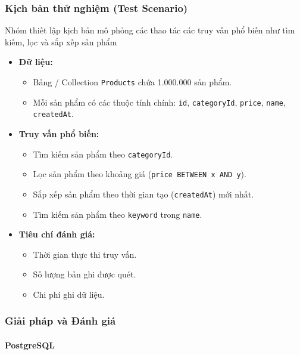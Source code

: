 \subsubsection{Kịch bản thử nghiệm (Test Scenario)}
Nhóm thiết lập kịch bản mô phỏng các thao tác các truy vấn phổ biến như tìm kiếm, lọc và sắp xếp sản phẩm
\begin{itemize}[label=$\circ$]
    \item \textbf{Dữ liệu:}
    \begin{itemize}[label=$\bullet$]
        \item Bảng / Collection \texttt{Products} chứa 1.000.000 sản phẩm.
        \item Mỗi sản phẩm có các thuộc tính chính: \texttt{id}, \texttt{categoryId}, \texttt{price}, \texttt{name}, \texttt{createdAt}.
    \end{itemize}
    
    \item \textbf{Truy vấn phổ biến:}
    \begin{itemize}[label=$\bullet$]
        \item Tìm kiếm sản phẩm theo \texttt{categoryId}.
        \item Lọc sản phẩm theo khoảng giá (\texttt{price BETWEEN x AND y}).
        \item Sắp xếp sản phẩm theo thời gian tạo (\texttt{createdAt}) mới nhất.
        \item Tìm kiếm sản phẩm theo \texttt{keyword} trong \texttt{name}.
    \end{itemize}

    \item \textbf{Tiêu chí đánh giá:}
    \begin{itemize}[label=$\bullet$]
        \item Thời gian thực thi truy vấn.
        \item Số lượng bản ghi được quét.
        \item Chi phí ghi dữ liệu.
    \end{itemize}
\end{itemize}

\subsubsection{Giải pháp và Đánh giá}

\paragraph{PostgreSQL}

